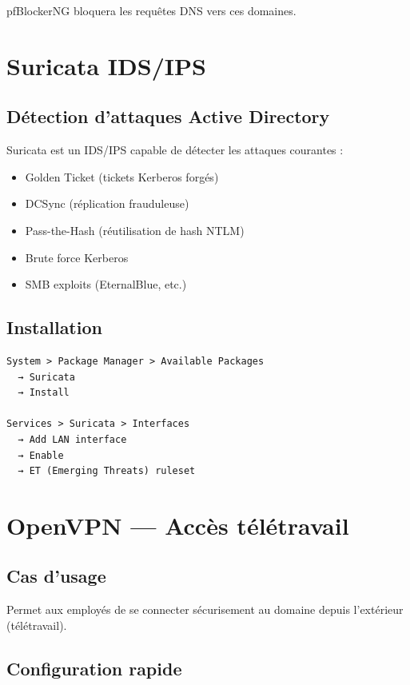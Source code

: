 pfBlockerNG bloquera les requêtes DNS vers ces domaines.

\section{Suricata IDS/IPS}

\subsection{Détection d'attaques Active Directory}

Suricata est un IDS/IPS capable de détecter les attaques courantes :

\begin{itemize}
    \item Golden Ticket (tickets Kerberos forgés)
    \item DCSync (réplication frauduleuse)
    \item Pass-the-Hash (réutilisation de hash NTLM)
    \item Brute force Kerberos
    \item SMB exploits (EternalBlue, etc.)
\end{itemize}

\subsection{Installation}

\begin{lstlisting}
System > Package Manager > Available Packages
  → Suricata
  → Install

Services > Suricata > Interfaces
  → Add LAN interface
  → Enable
  → ET (Emerging Threats) ruleset
\end{lstlisting}

\section{OpenVPN — Accès télétravail}

\subsection{Cas d'usage}

Permet aux employés de se connecter sécurisement au domaine depuis l'extérieur (télétravail).

\subsection{Configuration rapide}

